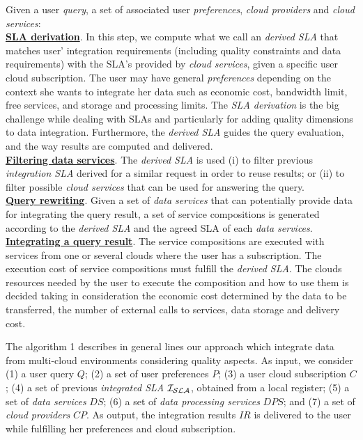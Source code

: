 Given a user \textit{query}, a set of associated user \textit{preferences}, \textit{cloud providers} and \textit{cloud services}:
\\
\textbf{\underline{SLA derivation}}. In this step, we compute what we call an \textsl{derived SLA} that matches user' integration requirements (including quality constraints and data requirements) with the SLA's provided by \textit{cloud services}, given a specific user cloud subscription. The user may have general \textit{preferences} depending on the context she wants to integrate her data such as economic cost, bandwidth limit, free services, and storage and processing limits. The \textit{SLA derivation} is the big challenge while dealing with SLAs and particularly for adding quality dimensions to data integration. Furthermore, the \textsl{derived SLA} guides the query evaluation, and the way results are computed and delivered. \\
\textbf{\underline{Filtering data services}}. The \textsl{derived SLA} is used (i)
to filter previous \textsl{integration SLA} derived for a similar request in order to reuse results; or (ii) to filter possible \textit{cloud services} that can be used for answering the query. \\ %
\textbf{\underline{Query rewriting}}. Given a set of \textit{data services} that can
potentially provide data for integrating the query result, a set of service compositions is generated according to the \textsl{derived SLA} and the agreed SLA of each \textit{data services}. \\
\textbf{\underline{Integrating a query result}}. The service compositions are
executed with services from one or several clouds where the user has a
subscription.
The execution cost of service compositions must fulfill the \textsl{derived
SLA}. The clouds resources needed by the user to execute the composition and how
to use them is decided taking in consideration the economic cost determined by
the data to be transferred, the number of external calls to services, data storage and delivery cost.

The algorithm 1 describes in general lines our approach which integrate data
from multi-cloud environments considering quality aspects.
%
As input, we consider (1) a user query $Q$; (2) a set of user preferences $P$;
(3) a user cloud subscription $C$; (4) a set of previous \textit{integrated SLA}
$\bigSLA$, obtained from a local register; (5) a set of \textit{data services}
$DS$; (6) a set of \textit{data processing services} $DPS$; and (7) a set of \textit{cloud providers} $CP$. As output, the integration results $IR$ is delivered to the user while fulfilling her preferences and cloud subscription.
%

